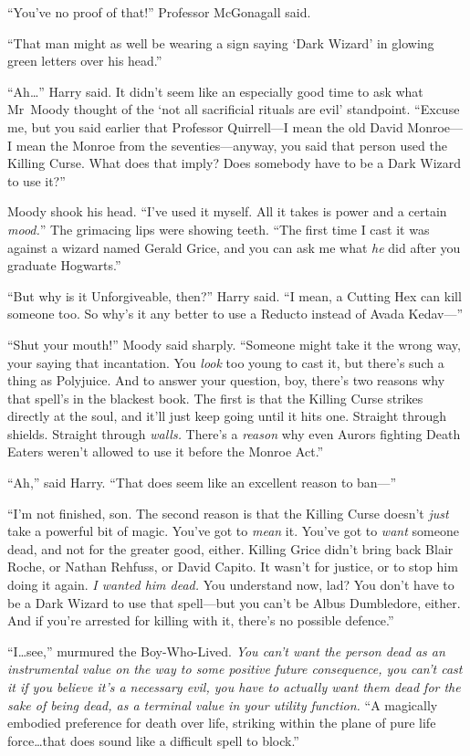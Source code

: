 “You’ve no proof of that!” Professor McGonagall said.

“That man might as well be wearing a sign saying ‘Dark Wizard’ in glowing green letters over his head.”

“Ah…” Harry said. It didn’t seem like an especially good time to ask what Mr~Moody thought of the ‘not all sacrificial rituals are evil’ standpoint. “Excuse me, but you said earlier that Professor Quirrell—I mean the old David Monroe—I mean the Monroe from the seventies—anyway, you said that person used the Killing Curse. What does that imply? Does somebody have to be a Dark Wizard to use it?”

Moody shook his head. “I’ve used it myself. All it takes is power and a certain \emph{mood.}” The grimacing lips were showing teeth. “The first time I cast it was against a wizard named Gerald Grice, and you can ask me what \emph{he} did after you graduate Hogwarts.”

“But why is it Unforgiveable, then?” Harry said. “I mean, a Cutting Hex can kill someone too. So why’s it any better to use a Reducto instead of Avada Kedav—”

“Shut your mouth!” Moody said sharply. “Someone might take it the wrong way, your saying that incantation. You \emph{look} too young to cast it, but there’s such a thing as Polyjuice. And to answer your question, boy, there’s two reasons why that spell’s in the blackest book. The first is that the Killing Curse strikes directly at the soul, and it’ll just keep going until it hits one. Straight through shields. Straight through \emph{walls.} There’s a \emph{reason} why even Aurors fighting Death Eaters weren’t allowed to use it before the Monroe Act.”

“Ah,” said Harry. “That does seem like an excellent reason to ban—”

“I’m not finished, son. The second reason is that the Killing Curse doesn’t \emph{just} take a powerful bit of magic. You’ve got to \emph{mean} it. You’ve got to \emph{want} someone dead, and not for the greater good, either. Killing Grice didn’t bring back Blair Roche, or Nathan Rehfuss, or David Capito. It wasn’t for justice, or to stop him doing it again. \emph{I wanted him dead.} You understand now, lad? You don’t have to be a Dark Wizard to use that spell—but you can’t be Albus Dumbledore, either. And if you’re arrested for killing with it, there’s no possible defence.”

“I…see,” murmured the Boy-Who-Lived. \emph{You can’t want the person dead as an instrumental value on the way to some positive future consequence, you can’t cast it if you believe it’s a necessary evil, you have to actually want them dead for the sake of being dead, as a terminal value in your utility function.} “A magically embodied preference for death over life, striking within the plane of pure life force…that does sound like a difficult spell to block.”

